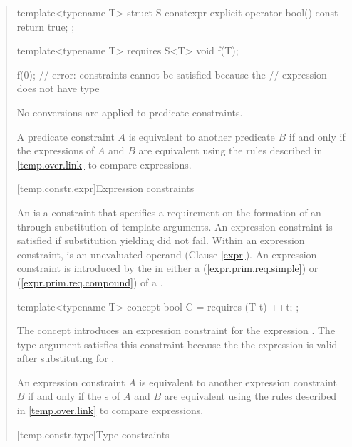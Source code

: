 \begin{quote}
\begin{codeblock}
template<typename T>
  struct S {
    constexpr explicit operator bool() const { return true; }
  };

template<typename T>
  requires S<T>{}
    void f(T);

f(0); // error: constraints cannot be satisfied because the
      // expression  does not have type 
\end{codeblock}
No conversions are applied to predicate constraints.
\exitexample

\pnum
A predicate constraint $A$ is equivalent to another predicate
$B$ if and only if the expressions of $A$ and $B$ are equivalent using the 
rules described in \ref{temp.over.link} to compare
expressions.


[temp.constr.expr]{Expression constraints}

\pnum
An  is a constraint
that specifies a requirement on the formation of an
 
through substitution of template arguments.
% 
An expression constraint is satisfied if substitution 
yielding  did not fail. 
% 
Within an expression constraint,  is an unevaluated 
operand (Clause \ref{expr}).
% 
\enternote
An expression constraint is introduced by the  in 
either a  (\ref{expr.prim.req.simple})
or  (\ref{expr.prim.req.compound})
of a .
\exitnote
% 
\enterexample
\begin{codeblock}
template<typename T> concept bool C = requires (T t) { ++t; };
\end{codeblock}
The concept  introduces an expression constraint for 
the expression .
% 
The type argument  satisfies this constraint because the
the expression  is valid after substituting 
for .
\exitexample

\pnum
An expression constraint $A$ is equivalent to another expression
constraint $B$ if and only if the s of
$A$ and $B$ are equivalent using the rules described 
in \ref{temp.over.link} to compare expressions.


[temp.constr.type]{Type constraints}


\end{quote}
